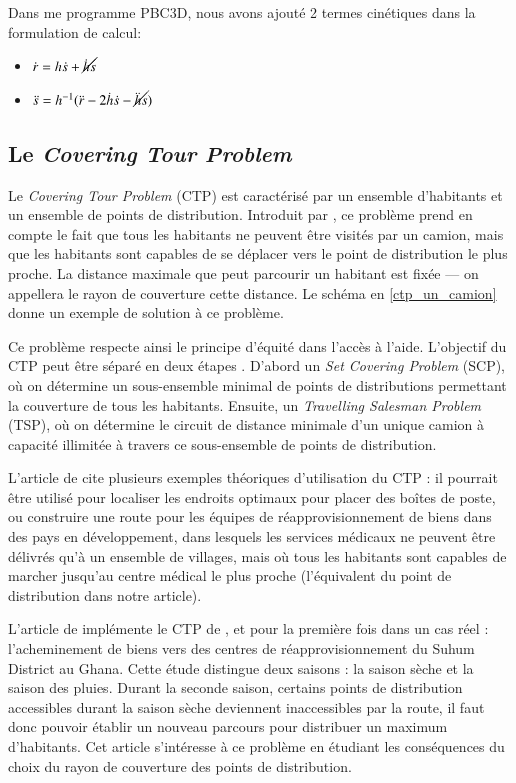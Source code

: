 \documentclass[5p,authoryear,square]{elsarticle}
\begin{document}
Dans me programme PBC3D, nous avons ajouté 2 termes cinétiques dans la formulation de calcul:
\begin{itemize}
	\item $\dot{r} = h\dot{s} + \cancel{\dot{h}s}$
	\item $\ddot{s} = h^{-1}(\ddot{r} - 2\dot{h}\dot{s} - \cancel{\ddot{h}s})$
\end{itemize}

\subsection{Le \emph{Covering Tour Problem}} \label{ctp}

Le \emph{Covering Tour Problem} (CTP) est caractérisé par un ensemble d'habitants et un ensemble de points de distribution. Introduit par \cite{gendreau_covering_1997}, ce problème prend en compte le fait que tous les habitants ne peuvent être visités par un camion, mais que les habitants sont capables de se déplacer vers le point de distribution le plus proche. La distance maximale que peut parcourir un habitant est fixée — on appellera le rayon de couverture cette distance. Le schéma en \cref{ctp_un_camion} donne un exemple de solution à ce problème.

Ce problème respecte ainsi le principe d'équité dans l'accès à l'aide. L'objectif du CTP peut être séparé en deux étapes \citep{jozefowiez_bi-objective_2007}. D'abord un \emph{Set Covering Problem} (SCP), où on détermine un sous-ensemble minimal de points de distributions permettant la couverture de tous les habitants. Ensuite, un \emph{Travelling Salesman Problem} (TSP), où on détermine le circuit de distance minimale d'un unique camion à capacité illimitée à travers ce sous-ensemble de points de distribution.

L'article de \cite{gendreau_covering_1997} cite plusieurs exemples théoriques d'utilisation du CTP : il pourrait être utilisé pour localiser les endroits optimaux pour placer des boîtes de poste, ou construire une route pour les équipes de réapprovisionnement de biens dans des pays en développement, dans lesquels les services médicaux ne peuvent être délivrés qu’à un ensemble de villages, mais où tous les habitants sont capables de marcher jusqu'au centre médical le plus proche (l'équivalent du point de distribution dans notre article).

L’article de \cite{hodgson_covering_1998} implémente le CTP de \cite{gendreau_covering_1997}, et pour la première fois dans un cas réel : l’acheminement de biens vers des centres de réapprovisionnement du Suhum District au Ghana. Cette étude distingue deux saisons : la saison sèche et la saison des pluies. Durant la seconde saison, certains points de distribution accessibles durant la saison sèche deviennent inaccessibles par la route, il faut donc pouvoir établir un nouveau parcours pour distribuer un maximum d’habitants. Cet article s’intéresse à ce problème en étudiant les conséquences du choix du rayon de couverture des points de distribution.
\end{document}
